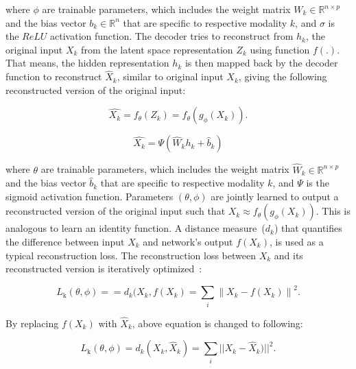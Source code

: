 \hspace*{3.5mm} where $\phi$ are trainable parameters, which includes the weight matrix $W_{k} \in \mathbb{R}^{n \times p}$ and the bias vector $b_{k} \in \mathbb{R}^{n}$ that are specific to respective modality $k$, and $\sigma$ is the $ReLU$ activation function. The decoder tries to reconstruct from $h_k$, the original input $X_{k}$ from the latent space representation $Z_k$ using function $f(.)$. That means, the hidden representation $h_{k}$ is then mapped back by the decoder function to reconstruct $\hat{X}_{k}$, similar to original input ${X}_{k}$, giving the following reconstructed version of the original input:

\begin{equation}
    \hat{X_k}=f_{\theta}\left(Z_k\right)=f_{\theta}\left(g_{\phi}({X_k})\right). 
\end{equation}

\begin{equation}
    \hat{X_k}=\Psi \left(\hat W_k h_k + \hat b_{k}\right)
\end{equation}

\hspace*{3.5mm} where $\theta$ are trainable parameters, which includes the weight matrix $\hat W_{k} \in \mathbb{R}^{n \times p}$ and the bias vector $\hat b_{k}$ that are specific to respective modality $k$, and $\Psi$ is the sigmoid activation function. Parameters $(\theta,\phi)$ are jointly learned to output a reconstructed version of the original input such that ${X_k} \approx f_{\theta}\left(g_{\phi}({X_k})\right)$. This is analogous to learn an identity function. A distance measure~($d_{k}$) that quantifies the difference between input $X_{k}$ and network's output $f(X_{k})$, is used as a typical reconstruction loss. The reconstruction loss between $X_{k}$ and its reconstructed version is iteratively optimized~\cite{KarimIEEEAccess2019}: 

\begin{equation}
    L_{\mathrm{k}}(\theta, \phi)==\text{$d_{k}$}(X_{k}, f(X_{k}) = \sum_{i} \left\|X_{k}-f(X_{k})\right\|^{2}.
\end{equation}

\hspace*{3.5mm} By replacing $f(X_{k})$ with $\hat{X}_{k}$, above equation is changed to following: 

\begin{equation}
    L_{\mathrm{k}}(\theta, \phi)=\text{$d_{k}$}(X_{k}, \hat{X}_{k}) = \sum_{i} ||X_{k}-\hat{X}_{k})||^{2}.
    \label{eq:ce_loss}
\end{equation}


